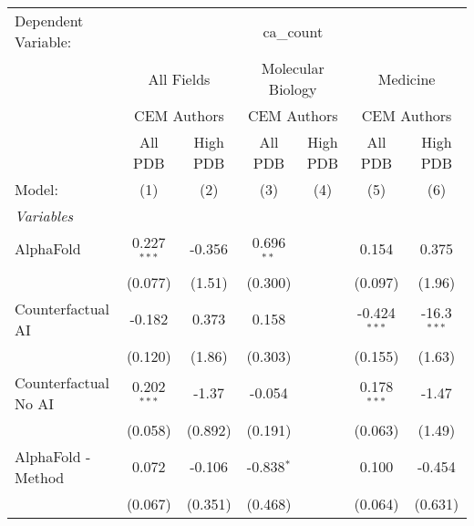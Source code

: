 \begingroup
\centering
\begin{tabular}{lcccccc}
   \tabularnewline \midrule \midrule
   Dependent Variable: & \multicolumn{6}{c}{ca\_count}\\
 & \multicolumn{2}{c}{All Fields} & \multicolumn{2}{c}{Molecular Biology} & \multicolumn{2}{c}{Medicine} \\
\cmidrule(lr){2-3} \cmidrule(lr){4-5} \cmidrule(lr){6-7}
 & \multicolumn{2}{c}{CEM Authors} & \multicolumn{2}{c}{CEM Authors} & \multicolumn{2}{c}{CEM Authors} \\
\cmidrule(lr){2-3} \cmidrule(lr){4-5} \cmidrule(lr){6-7}
 & \multicolumn{1}{c}{All PDB} & \multicolumn{1}{c}{High PDB} & \multicolumn{1}{c}{All PDB} & \multicolumn{1}{c}{High PDB} & \multicolumn{1}{c}{All PDB} & \multicolumn{1}{c}{High PDB} \\
\cmidrule(lr){2-2} \cmidrule(lr){3-3} \cmidrule(lr){4-4} \cmidrule(lr){5-5} \cmidrule(lr){6-6} \cmidrule(lr){7-7}
   Model:                                                     & (1)           & (2)           & (3)           & (4)   & (5)            & (6)\\  
   \midrule
   \emph{Variables}\\
   AlphaFold                                                  & 0.227$^{***}$ & -0.356        & 0.696$^{**}$  &       & 0.154          & 0.375\\   
                                                              & (0.077)       & (1.51)        & (0.300)       &       & (0.097)        & (1.96)\\   
   Counterfactual AI                                          & -0.182        & 0.373         & 0.158         &       & -0.424$^{***}$ & -16.3$^{***}$\\   
                                                              & (0.120)       & (1.86)        & (0.303)       &       & (0.155)        & (1.63)\\   
   Counterfactual No AI                                       & 0.202$^{***}$ & -1.37         & -0.054        &       & 0.178$^{***}$  & -1.47\\   
                                                              & (0.058)       & (0.892)       & (0.191)       &       & (0.063)        & (1.49)\\   
   AlphaFold - Method                                         & 0.072         & -0.106        & -0.838$^{*}$  &       & 0.100          & -0.454\\   
                                                              & (0.067)       & (0.351)       & (0.468)       &       & (0.064)        & (0.631)\\   

\end{tabular}
